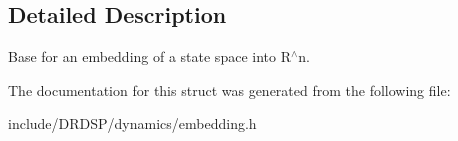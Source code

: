 \subsection{Detailed Description}
Base for an embedding of a state space into R$^\wedge$n. 

The documentation for this struct was generated from the following file\-:\begin{DoxyCompactItemize}
\item 
include/\-D\-R\-D\-S\-P/dynamics/embedding.\-h\end{DoxyCompactItemize}

